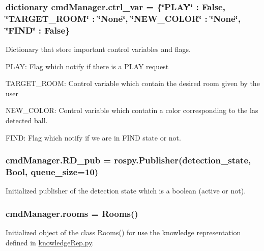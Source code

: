 \subsubsection[{\texorpdfstring{ctrl\+\_\+var}{ctrl_var}}]{\setlength{\rightskip}{0pt plus 5cm}dictionary cmd\+Manager.\+ctrl\+\_\+var = \{\char`\"{}P\+L\+AY\char`\"{} \+: False, \char`\"{}T\+A\+R\+G\+E\+T\+\_\+\+R\+O\+OM\char`\"{} \+: \char`\"{}None\char`\"{}, \char`\"{}N\+E\+W\+\_\+\+C\+O\+L\+OR\char`\"{} \+: \char`\"{}None\char`\"{}, \char`\"{}F\+I\+ND\char`\"{} \+: False\}}\hypertarget{namespacecmdManager_a927e4211865b745599afe42e9e8d7c8e}{}\label{namespacecmdManager_a927e4211865b745599afe42e9e8d7c8e}


Dictionary that store important control variables and flags. 


\begin{DoxyItemize}
\item P\+L\+AY\+: Flag which notify if there is a P\+L\+AY request
\item T\+A\+R\+G\+E\+T\+\_\+\+R\+O\+OM\+: Control variable which contain the desired room given by the user
\item N\+E\+W\+\_\+\+C\+O\+L\+OR\+: Control variable which contatin a color corresponding to the las detected ball.
\item F\+I\+ND\+: Flag which notify if we are in F\+I\+ND state or not. 
\end{DoxyItemize}
\subsubsection[{\texorpdfstring{R\+D\+\_\+pub}{RD_pub}}]{\setlength{\rightskip}{0pt plus 5cm}cmd\+Manager.\+R\+D\+\_\+pub = rospy.\+Publisher(\textquotesingle{}detection\+\_\+state\textquotesingle{}, Bool, queue\+\_\+size=10)}\hypertarget{namespacecmdManager_a5f10b08efaeaad88cf34e075895f4d9d}{}\label{namespacecmdManager_a5f10b08efaeaad88cf34e075895f4d9d}


Initialized publisher of the detection state which is a boolean (active or not). 

\subsubsection[{\texorpdfstring{rooms}{rooms}}]{\setlength{\rightskip}{0pt plus 5cm}cmd\+Manager.\+rooms = {\bf Rooms}()}\hypertarget{namespacecmdManager_a783b0ef84682af39dc9f2b8e828c4ad9}{}\label{namespacecmdManager_a783b0ef84682af39dc9f2b8e828c4ad9}


Initialized object of the class Rooms() for use the knowledge representation defined in \hyperlink{knowledgeRep_8py}{knowledge\+Rep.\+py}. 

